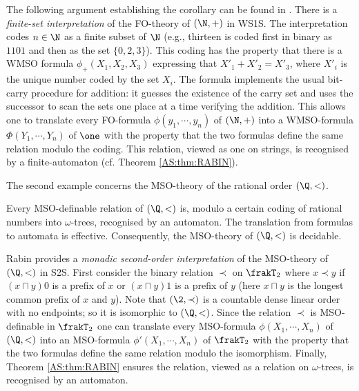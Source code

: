 The following argument establishing the corollary can be found in \cite{Robi58} \cite{Buch60} \cite{Elgo61}. There is a {\em finite-set interpretation} of the FO-theory of $(\N,+)$ in WS1S.
The interpretation codes $n \in \N$ as a finite subset of $\N$ (e.g., thirteen is coded first in binary as $1101$ and then as the set $\{0,2,3\}$). This coding has the property that there is a WMSO formula $\phi_+(X_1,X_2,X_3)$ expressing that 
$X'_1 + X'_2 = X'_3$, where $X'_i$ is the unique number coded by the set $X_i$. The formula implements the usual bit-carry procedure for addition:
it guesses the existence of the carry set and uses the successor to scan the
sets one place at a time verifying the addition. 
This allows one to translate every FO-formula $\phi(y_1,\cdots,y_n)$ of $(\N,+)$ into a WMSO-formula
$\Phi(Y_1,\cdots,Y_n)$ of $\one$  with the property that
the two formulas define the same relation modulo the coding. This relation, viewed as one on strings,
is recognised by a finite-automaton (cf. Theorem \ref{AS:thm:RABIN}).

The second example concerns the MSO-theory of the rational order $(\Q,<)$.

\begin{corollary} \label{AS:cor:rationals}
Every MSO-definable relation of $(\Q,<)$ is, modulo a certain coding of rational numbers into $\omega$-trees, recognised by an automaton. The translation from formulas to automata is effective. Consequently, the MSO-theory of $(\Q,<)$ is decidable.
\end{corollary}

Rabin \cite{Rabi69} provides a {\em monadic second-order interpretation} of the MSO-theory of $(\Q,<)$ in S2S.
First consider the binary relation 
 $\prec$ on $\frakT_2$ where $x \prec y$ if $(x \sqcap y)0$ is a prefix of $x$ or 
$(x \sqcap y)1$ is a prefix of $y$ (here $x \sqcap y$ is the longest common prefix of $x$ and $y$). %
Note that $(\2,\prec)$ is a countable dense linear order with no endpoints;  so it is isomorphic to $(\Q,<)$.
Since the relation $\prec$ is MSO-definable in $\frakT_2$ one can translate every MSO-formula $\phi(X_1,\cdots,X_n)$ of $(\Q,<)$ into an MSO-formula
$\phi'(X_1,\cdots,X_n)$ of $\frakT_2$  with the property that
the two formulas define the same relation modulo the isomorphism. Finally, Theorem \ref{AS:thm:RABIN}  ensures
the relation, viewed as a relation on $\omega$-trees, is recognised by an automaton.

